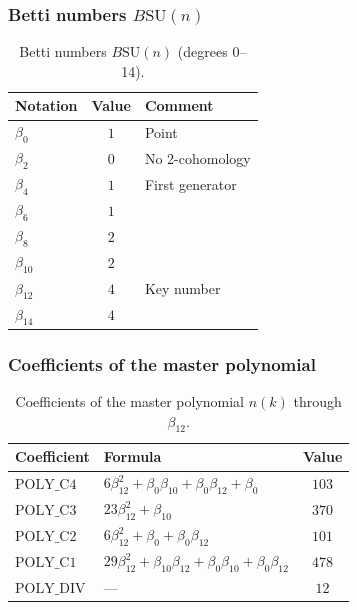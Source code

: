 \documentclass[11pt,a4paper]{article}
\newcommand{\SU}{\ensuremath{\mathrm{SU}}}
\theoremstyle{definition}
\begin{document}
\subsubsection{Betti numbers \texorpdfstring{$B\SU(n)$}{B(n)}}

\begin{table}[ht]
\centering
\caption{Betti numbers \texorpdfstring{$B\SU(n)$}{B(n)} (degrees 0–14).}
\label{tab:app-betti}
\begin{tabular}{lcl}
\toprule
Notation & Value & Comment \\
\midrule
$\beta_0$  & $1$ & Point \\
$\beta_2$  & $0$ & No 2-cohomology \\
$\beta_4$  & $1$ & First generator \\
$\beta_6$  & $1$ & \\
$\beta_8$  & $2$ & \\
$\beta_{10}$ & $2$ & \\
$\beta_{12}$ & $4$ & Key number \\
$\beta_{14}$ & $4$ & \\
\bottomrule
\end{tabular}
\end{table}

\subsubsection{Coefficients of the master polynomial}

\begin{table}[ht]
\centering
\caption{Coefficients of the master polynomial \texorpdfstring{$n(k)$}{n(k)} through \texorpdfstring{$\beta_{12}$}{\_12}.}
\label{tab:app-poly-coeffs}
\begin{tabular}{llc}
\toprule
Coefficient & Formula & Value \\
\midrule
$\text{POLY\_C4}$ & $6\beta_{12}^2 + \beta_0\beta_{10} + \beta_0\beta_{12} + \beta_0$ & $103$ \\
$\text{POLY\_C3}$ & $23\beta_{12}^2 + \beta_{10}$ & $370$ \\
$\text{POLY\_C2}$ & $6\beta_{12}^2 + \beta_0 + \beta_0\beta_{12}$ & $101$ \\
$\text{POLY\_C1}$ & $29\beta_{12}^2 + \beta_{10}\beta_{12} + \beta_0\beta_{10} + \beta_0\beta_{12}$ & $478$ \\
$\text{POLY\_DIV}$ & — & $12$ \\
\bottomrule
\end{tabular}
\end{table}
\end{document}
